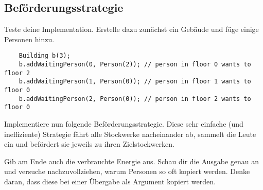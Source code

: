 \subsection{Beförderungsstrategie}
Teste deine Implementation.
Erstelle dazu zunächst ein Gebäude und füge einige Personen hinzu.

\begin{lstlisting}
    Building b(3);
    b.addWaitingPerson(0, Person(2)); // person in floor 0 wants to floor 2
    b.addWaitingPerson(1, Person(0)); // person in floor 1 wants to floor 0
    b.addWaitingPerson(2, Person(0)); // person in floor 2 wants to floor 0
\end{lstlisting}

Implementiere nun folgende Beförderungsstrategie.
Diese sehr einfache (und ineffiziente) Strategie fährt alle Stockwerke nacheinander ab, sammelt die Leute ein und befördert sie jeweils zu ihren Zielstockwerken.

\begin{algorithm}[H]
 \SetAlgoLined
\end{algorithm}

Gib am Ende auch die verbrauchte Energie aus.
Schau dir die Ausgabe genau an und versuche nachzuvollziehen, warum Personen so oft kopiert werden.
Denke daran, dass diese bei einer Übergabe als Argument kopiert werden.

